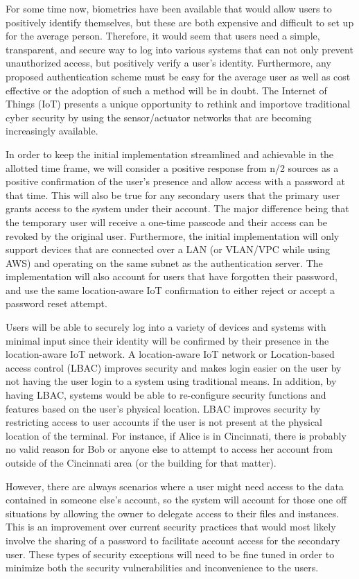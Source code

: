 \documentclass[11pt,journal]{IEEEtran}
\begin{document}
For some time now, biometrics have been available that would allow users to positively identify themselves, but these are both expensive and difficult to set up for the average person.  Therefore, it would seem that users need a simple, transparent, and secure way to log into various systems that can not only prevent unauthorized access, but positively verify a user’s identity.  Furthermore, any proposed authentication scheme must be easy for the average user as well as cost effective or the adoption of such a method will be in doubt.  The Internet of Things (IoT) presents a unique opportunity to rethink and importove traditional cyber security by using the sensor/actuator networks that are becoming increasingly available.

In order to keep the initial implementation streamlined and achievable in the allotted time frame, we will consider a positive response from n/2 sources as a positive confirmation of the  user’s presence and allow access with a password at that time.  This will also be true for any secondary users that the primary user grants access to the system under their account.  The major difference being that the temporary user will receive a one-time passcode and their access can be revoked by the original user.  Furthermore, the initial implementation will only support devices that are connected over a LAN (or VLAN/VPC while using AWS) and operating on the same subnet as the authentication server.  The implementation will also account for users that have forgotten their password, and use the same location-aware IoT confirmation to either reject or accept a password reset attempt.

Users will be able to securely log into a variety of devices and systems with minimal input since their identity will be confirmed by their presence in the location-aware IoT network.  A location-aware IoT network or Location-based access control (LBAC) improves security and makes login easier on the user by not having the user login to a system using traditional means.  In addition, by having LBAC, systems would be able to re-configure security functions and features based on the user’s physical location. LBAC improves security by restricting access to user accounts if the  user is not present at the physical location of the terminal. For instance, if Alice is in Cincinnati, there is probably no valid reason for Bob or anyone else to attempt to access her account from outside of the Cincinnati area (or the building for that matter).  

However, there are always scenarios where a user might need access to the data contained in someone else’s account, so the system will account for those one off situations by allowing the owner to delegate access to their files and instances. This is an improvement over current security practices that would most likely involve the sharing of a password to facilitate account access for the secondary user.  These types of security exceptions will need to be fine tuned in order to minimize both the security vulnerabilities and inconvenience to the users.
\end{document}
